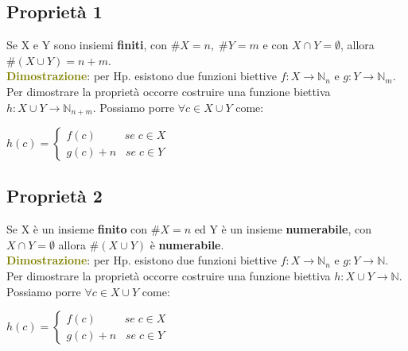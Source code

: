 \subsection{Proprietà 1}
Se X e Y sono insiemi \textbf{finiti}, con $\#X = n, \; \#Y = m$ e con $X \cap Y = \emptyset$, allora $\#(X \cup Y) = n + m$. \\
\textcolor{olive}{\textbf{Dimostrazione}}: per Hp. esistono due funzioni biettive $f : X \rightarrow \mathbb{N}_n$ e $g : Y \rightarrow \mathbb{N}_m$. Per dimostrare la proprietà occorre costruire una funzione biettiva $h : X \cup Y \rightarrow \mathbb{N}_{n + m}$. Possiamo porre $\forall c \in X \cup Y$ come:
\begin{center}
    \begin{math}
        h(c) = 
        \begin{cases}
            f(c) \qquad \;\; se \; c \in X \\
            g(c) + n \; \;\; se \; c \in Y
        \end{cases}
    \end{math}
\end{center}

\subsection{Proprietà 2}
Se X è un insieme \textbf{finito} con $\#X = n$ ed Y è un insieme \textbf{numerabile}, con $X \cap Y = \emptyset$ allora $\#(X \cup Y)$ è \textbf{numerabile}. \\
\textcolor{olive}{\textbf{Dimostrazione}}: per Hp. esistono due funzioni biettive $f : X \rightarrow \mathbb{N}_n$ e $g : Y \rightarrow \mathbb{N}$. Per dimostrare la proprietà occorre costruire una funzione biettiva $h : X \cup Y \rightarrow \mathbb{N}$. Possiamo porre $\forall c \in X \cup Y$ come:
\begin{center}
    \begin{math}
        h(c) = 
        \begin{cases}
            f(c) \qquad \;\; se \; c \in X \\
            g(c) + n \; \;\; se \; c \in Y
        \end{cases}
    \end{math}
\end{center}

\newpage
